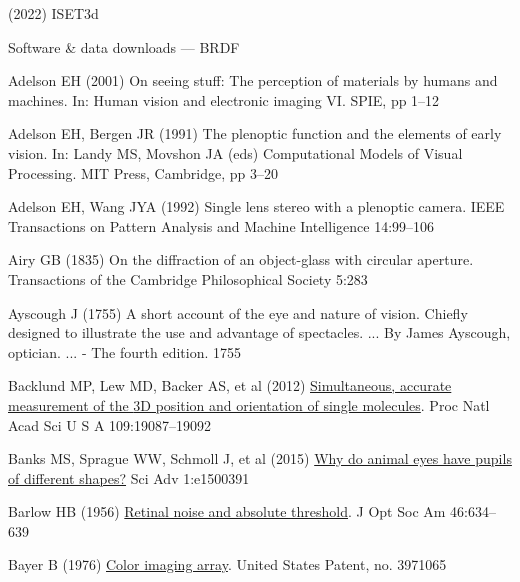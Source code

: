 \documentclass[
  letterpaper,
]{book}
\newlength{\cslhangindent}
\newenvironment{CSLReferences}[2] %
 {\begin{list}{}{%
  \setlength{\itemindent}{0pt}
  \setlength{\leftmargin}{0pt}
  \setlength{\parsep}{0pt}
  \ifodd #1
   \setlength{\leftmargin}{\cslhangindent}
   \setlength{\itemindent}{-1\cslhangindent}
  \fi
  \setlength{\itemsep}{#2\baselineskip}}}
 {\end{list}}
\begin{document}
\label{refs}
\begin{CSLReferences}{1}{1}
(2022) {ISET3d}

Software \& data downloads --- {BRDF}

Adelson EH (2001) On seeing stuff: {The} perception of materials by
humans and machines. In: Human vision and electronic imaging {VI}. SPIE,
pp 1--12

Adelson EH, Bergen JR (1991) The plenoptic function and the elements of
early vision. In: Landy MS, Movshon JA (eds) Computational {Models} of
{Visual Processing}. MIT Press, Cambridge, pp 3--20

Adelson EH, Wang JYA (1992) Single lens stereo with a plenoptic camera.
IEEE Transactions on Pattern Analysis and Machine Intelligence
14:99--106

Airy GB (1835) On the diffraction of an object-glass with circular
aperture. Transactions of the Cambridge Philosophical Society 5:283

Ayscough J (1755) {A short account of the eye and nature of vision.
Chiefly designed to illustrate the use and advantage of spectacles. ...
By James Ayscough, optician. ... - The fourth edition. 1755}

Backlund MP, Lew MD, Backer AS, et al (2012)
\href{http://dx.doi.org/10.1073/pnas.1216687109}{Simultaneous, accurate
measurement of the {3D} position and orientation of single molecules}.
Proc Natl Acad Sci U S A 109:19087--19092

Banks MS, Sprague WW, Schmoll J, et al (2015)
\href{http://dx.doi.org/10.1126/sciadv.1500391}{Why do animal eyes have
pupils of different shapes?} Sci Adv 1:e1500391

Barlow HB (1956) \href{http://dx.doi.org/10.1364/JOSA.46.000634}{Retinal
noise and absolute threshold}. J Opt Soc Am 46:634--639

Bayer B (1976)
\href{https://cir.nii.ac.jp/crid/1572261550680217344}{Color imaging
array}. United States Patent, no. 3971065


\end{CSLReferences}
\end{document}
